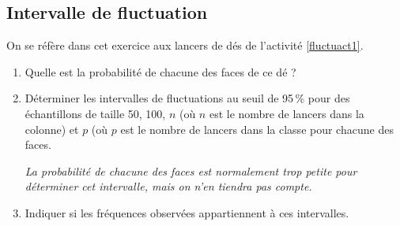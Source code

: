 \begin{exo}
\begin{footnotesize}
\begin{center}
\rand{} \quad \rand{} \quad \rand{} \quad \rand{} \quad \rand{} \quad \rand{} \quad \rand{} \quad \rand{} \quad \rand{} \quad \rand{} \quad \rand{} \quad \rand{} \quad \rand{} \quad \rand{} \quad \rand{} \quad \rand{} \quad \rand{} \quad \rand{} \quad \rand{} \quad \rand{} \quad \rand{} \quad \rand{} \quad \rand{} \quad \rand{} \quad \rand{} \quad \rand{} \quad \rand{} \quad \rand{} \quad \rand{} \quad \rand{}


\end{center}            \end{footnotesize}
\end{exo}



\subsection{Intervalle de fluctuation}

\begin{exo}
 On se r\'ef\`ere dans cet exercice aux lancers de d\'es de l'activit\'e \ref{fluctuact1}.
 \begin{enumerate}
  \item Quelle est la probabilit\'e de chacune des faces de ce d\'e ?
  \item D\'eterminer les intervalles de fluctuations au seuil de 95\,\% pour des \'echantillons de taille 50, 100, $n$ (o\`u $n$ est le nombre de lancers dans la colonne) et $p$ (o\`u $p$ est le nombre de lancers dans la classe pour chacune des faces.
  \begin{rmq}
   \emph{La probabilit\'e de chacune des faces est normalement trop petite pour d\'eterminer cet intervalle, mais on n'en tiendra pas compte.}
  \end{rmq}
  \item Indiquer si les fr\'equences observ\'ees appartiennent \`a ces intervalles.
 \end{enumerate}

\end{exo}

